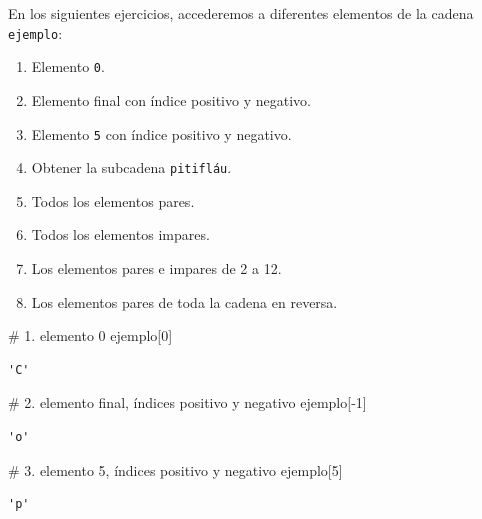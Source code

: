 \documentclass[
  spanish,
  letterpaper,
]{scrbook}
\newenvironment{Shaded}{\begin{snugshade}}{\end{snugshade}}
\newcommand{\CommentTok}[1]{\textcolor[rgb]{0.37,0.37,0.37}{#1}}
\newcommand{\DecValTok}[1]{\textcolor[rgb]{0.68,0.00,0.00}{#1}}
\newcommand{\NormalTok}[1]{\textcolor[rgb]{0.00,0.23,0.31}{#1}}
\newcommand{\OperatorTok}[1]{\textcolor[rgb]{0.37,0.37,0.37}{#1}}
\providecommand{\tightlist}{%
  \setlength{\itemsep}{0pt}\setlength{\parskip}{0pt}}
\theoremstyle{definition}
\theoremstyle{remark}
\begin{document}
\begin{tcolorbox}
En los siguientes ejercicios, accederemos a diferentes elementos de la
cadena \texttt{ejemplo}:

\begin{enumerate}
\def\labelenumi{\arabic{enumi}.}
\tightlist
\item
  Elemento \texttt{0}.
\item
  Elemento final con índice positivo y negativo.
\item
  Elemento \texttt{5} con índice positivo y negativo.
\item
  Obtener la subcadena \texttt{pitifláu}.
\item
  Todos los elementos pares.
\item
  Todos los elementos impares.
\item
  Los elementos pares e impares de 2 a 12.
\item
  Los elementos pares de toda la cadena en reversa.
\end{enumerate}

\end{tcolorbox}

\begin{Shaded}
\begin{Highlighting}[]
\CommentTok{\# 1. elemento 0}
\NormalTok{ejemplo[}\DecValTok{0}\NormalTok{]}
\end{Highlighting}
\end{Shaded}

\begin{verbatim}
'C'
\end{verbatim}

\begin{Shaded}
\begin{Highlighting}[]
\CommentTok{\# 2. elemento final, índices positivo y negativo}
\NormalTok{ejemplo[}\OperatorTok{{-}}\DecValTok{1}\NormalTok{]}
\end{Highlighting}
\end{Shaded}

\begin{verbatim}
'o'
\end{verbatim}

\begin{Shaded}
\begin{Highlighting}[]
\CommentTok{\# 3. elemento 5, índices positivo y negativo}
\NormalTok{ejemplo[}\DecValTok{5}\NormalTok{]}
\end{Highlighting}
\end{Shaded}

\begin{verbatim}
'p'
\end{verbatim}
\end{document}
